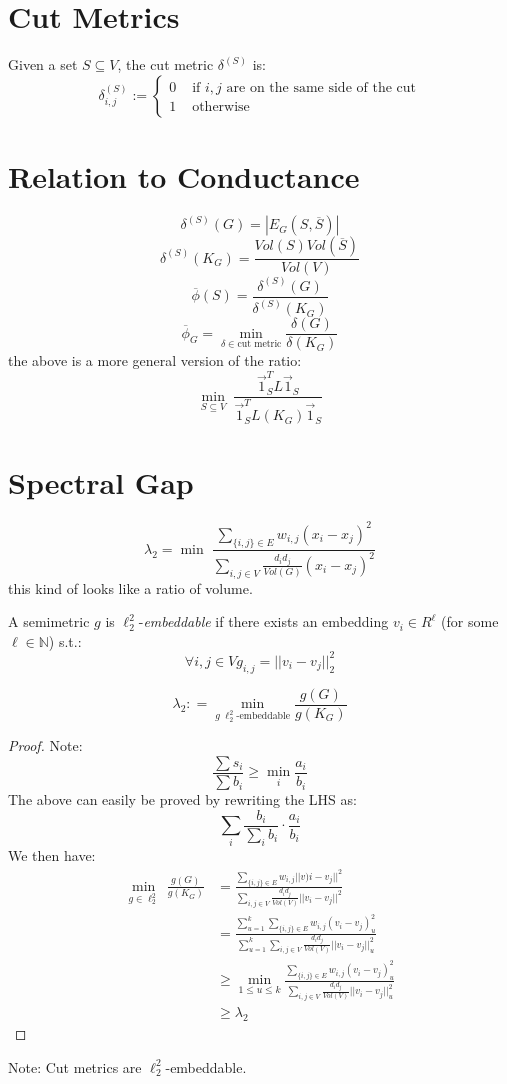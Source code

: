 \documentclass[11pt]{article}
\begin{document}
\section*{Cut Metrics}
\begin{definition}
Given a set $S \subseteq V$, the cut metric $\delta^{(S)}$ is:
\[
\delta_{i,j}^{(S)}:=\begin{cases}0 &\text{ if }i,j\text{ are on the same side of the cut}\\
1 &\text{ otherwise}
\end{cases} 
\]
\end{definition}
\section*{Relation to Conductance}
\[
    \delta^{(S)}(G) = |E_G(S,\overline{S})|  
\]
\[
    \delta^{(S)}(K_G) = \frac{Vol(S)Vol(\overline{S})}{Vol(V)}
\]
\[
    \overline{\phi}(S) = \frac{\delta^{(S)}(G)}{\delta^{(S)}(K_G)}
\]
\[
    \overline{\phi}_G= \underset{\delta \in \text{cut metric}}{\min}\frac{\delta(G)}{\delta(K_G)}
\]
the above is a more general version of the ratio:
\[
    \underset{S \subseteq V}{\min}\;\frac{\vec{1}_S^TL\vec{1}_S}{\vec{1}_S^TL(K_G)\vec{1}_S}    
\]
\section*{Spectral Gap}
\[
\lambda_2  =\min \;\frac{\sum_{\{i,j\} \in E}w_{i,j}(x_i - x_j)^2}{\sum_{i,j\in V}\frac{d_id_j}{Vol(G)}(x_i - x_j)^2}
\]
this kind of looks like a ratio of volume.
\begin{definition}
A semimetric $g$ is $\ell_2^2$-\emph{embeddable} if there exists an embedding $v_i \in R^{\ell}$ (for some $\ell\in \mathbb{N}$) s.t.:
\[
   \forall i,j\in V g_{i,j}=||v_i - v_j||_2^2 
\]
\end{definition}

\begin{lemma}
\[
    \lambda_2: = \underset{g \; \ell_2^2\text{-embeddable}}{\min}\frac{g(G)}{g(K_G)}
\]
\end{lemma}
\begin{proof}
Note:
\[
    \boxed{\frac{\sum s_i}{\sum b_i} \geq \underset{i}{\min} \frac{a_i}{b_i}}
\]
The above can easily be proved by rewriting the LHS as:
\[
    \sum_{i} \frac{b_i}{\sum_i b_i}\cdot \frac{a_i}{b_i}
\]
We then have:
\begin{align*}
    \underset{g \in \ell_2^2}{\min} \; \frac{g(G)}{g(K_G)} &= \frac{\sum_{\{i,j\} \in E} w_{i,j}||v)i - v_j||^2}{\sum_{i,j\in V}\frac{d_id_j}{Vol(V)}||v_i - v_j||^2}\\
    &= \frac{\sum_{u=1}^k\sum_{\{i,j\} \in E}w_{i,j}(v_i - v_j)^2_u}{\sum_{u=1}^k\sum_{i,j \in V}\frac{d_id_j}{Vol(V)}||v_i - v_j||^2_u}\\
    &\geq \underset{1 \leq u \leq k}{\min} \frac{\sum_{\{i,j\} \in E}w_{i,j}(v_i - v_j)^2_u}{\sum_{i,j \in V}\frac{d_id_j}{Vol(V)}||v_i - v_j||^2_u}\\
    &\geq \lambda_2
\end{align*}
\end{proof}
Note: Cut metrics are $\ell_2^2$-embeddable.\\ 
\end{document}
